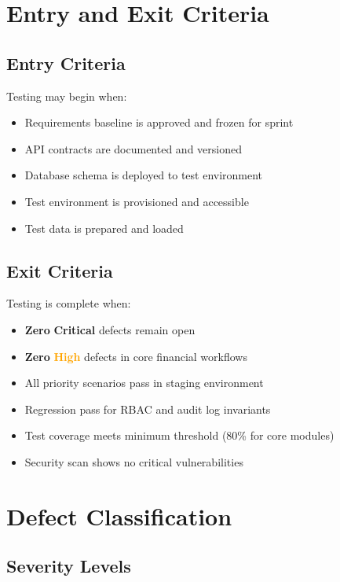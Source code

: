 \documentclass[11pt,a4paper]{article}
\newcommand{\critical}{\textcolor{accentred}{\textbf{Critical}}}
\newcommand{\highsev}{\textcolor{orange}{\textbf{High}}}
\begin{document}
\section{Entry and Exit Criteria}

\subsection{Entry Criteria}
Testing may begin when:
\begin{itemize}
    \item Requirements baseline is approved and frozen for sprint
    \item API contracts are documented and versioned
    \item Database schema is deployed to test environment
    \item Test environment is provisioned and accessible
    \item Test data is prepared and loaded
\end{itemize}

\subsection{Exit Criteria}
Testing is complete when:
\begin{itemize}
    \item \textbf{Zero} \critical{} defects remain open
    \item \textbf{Zero} \highsev{} defects in core financial workflows
    \item All priority scenarios pass in staging environment
    \item Regression pass for RBAC and audit log invariants
    \item Test coverage meets minimum threshold (80\% for core modules)
    \item Security scan shows no critical vulnerabilities
\end{itemize}

\section{Defect Classification}

\subsection{Severity Levels}
\end{document}
